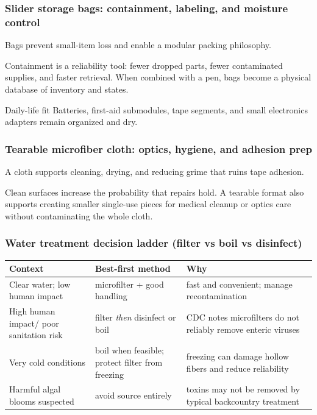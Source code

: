 \begin{frame}[t]
  \frametitle{Slider storage bags: containment, labeling, and moisture control}
  \justifying
   Bags prevent small-item loss and enable a modular packing philosophy.

  \vspace{0.5em}
   Containment is a reliability tool: fewer dropped parts, fewer contaminated supplies, and faster retrieval. When combined with a pen, bags become a physical database of inventory and states.

  \vspace{0.8em}
  \begin{block}{Daily-life fit}
    Batteries, first-aid submodules, tape segments, and small electronics adapters remain organized and dry.
  \end{block}
\end{frame}

\begin{frame}[t]
  \frametitle{Tearable microfiber cloth: optics, hygiene, and adhesion prep}
  \justifying
   A cloth supports cleaning, drying, and reducing grime that ruins tape adhesion.

  \vspace{0.5em}
   Clean surfaces increase the probability that repairs hold. A tearable format also supports creating smaller single-use pieces for medical cleanup or optics care without contaminating the whole cloth.
\end{frame}

\begin{frame}[t,shrink=2]
  \frametitle{Water treatment decision ladder (filter vs boil vs disinfect)}
  \justifying
  \DenseBodySize
  \begin{table}
    \centering
    \begin{tabularx}{\textwidth}{@{}lX X@{}}
      \toprule
      \textbf{Context} & \textbf{Best-first method} & \textbf{Why} \\
      \midrule
      Clear water; low human impact & microfilter + good handling & fast and convenient; manage recontamination~\cite{sawyer_mini_specs} \\
      High human impact/ poor sanitation risk & filter \emph{then} disinfect or boil & CDC notes microfilters do not reliably remove enteric viruses~\cite{cdc_yellowbook_filters_viruses,cdc_backcountry} \\
      Very cold conditions & boil when feasible; protect filter from freezing & freezing can damage hollow fibers and reduce reliability \\
      Harmful algal blooms suspected & avoid source entirely & toxins may not be removed by typical backcountry treatment \\
      \bottomrule
    \end{tabularx}
  \end{table}
\end{frame}

